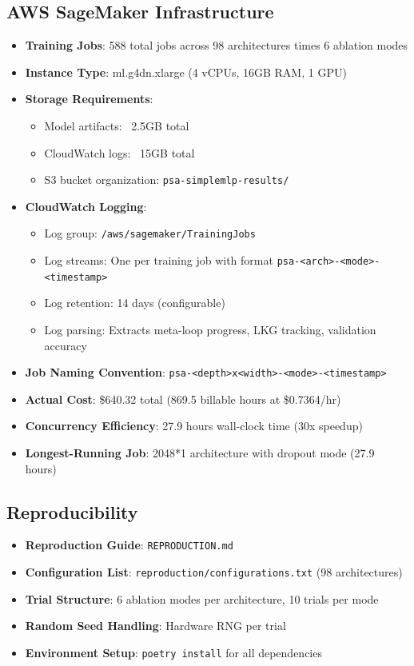 \documentclass[conference]{IEEEtran}
\begin{document}
\subsection*{AWS SageMaker Infrastructure}

\begin{itemize}
  \item \textbf{Training Jobs}: 588 total jobs across 98 architectures times 6 ablation modes
  \item \textbf{Instance Type}: ml.g4dn.xlarge (4 vCPUs, 16GB RAM, 1 GPU)
  \item \textbf{Storage Requirements}: 
    \begin{itemize}
      \item Model artifacts: ~2.5GB total
      \item CloudWatch logs: ~15GB total
      \item S3 bucket organization: \texttt{psa-simplemlp-results/}
    \end{itemize}
  \item \textbf{CloudWatch Logging}: 
    \begin{itemize}
      \item Log group: \texttt{/aws/sagemaker/TrainingJobs}
      \item Log streams: One per training job with format \texttt{psa-<arch>-<mode>-<timestamp>}
      \item Log retention: 14 days (configurable)
      \item Log parsing: Extracts meta-loop progress, LKG tracking, validation accuracy
    \end{itemize}
  \item \textbf{Job Naming Convention}: \texttt{psa-<depth>x<width>-<mode>-<timestamp>}
  \item \textbf{Actual Cost}: \$640.32 total (869.5 billable hours at \$0.7364/hr)
  \item \textbf{Concurrency Efficiency}: 27.9 hours wall-clock time (30x speedup)
  \item \textbf{Longest-Running Job}: 2048*1 architecture with dropout mode (27.9 hours)
\end{itemize}

\subsection*{Reproducibility}

\begin{itemize}
  \item \textbf{Reproduction Guide}: \texttt{REPRODUCTION.md}
  \item \textbf{Configuration List}: \texttt{reproduction/configurations.txt} (98 architectures)
  \item \textbf{Trial Structure}: 6 ablation modes per architecture, 10 trials per mode
  \item \textbf{Random Seed Handling}: Hardware RNG per trial
  \item \textbf{Environment Setup}: \texttt{poetry install} for all dependencies
\end{itemize}
\end{document}
